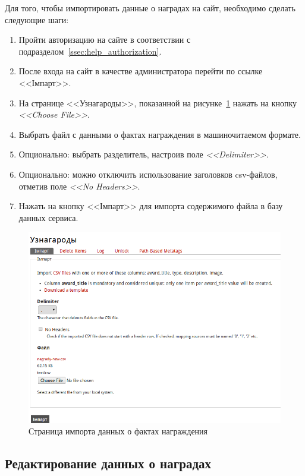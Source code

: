Для того, чтобы импортировать данные о наградах на сайт,
необходимо сделать следующие шаги:

\begin{enumerate}
\item Пройти авторизацию на сайте в соответствии с подразделом~\ref{ssec:help_authorization}.
\item После входа на сайт в качестве администратора перейти по ссылке <<Імпарт>>.
\item На странице <<Узнагароды>>, показанной на рисунке~\ref{fig:import_page}
  нажать на кнопку \textit{<<Choose File>>}.
\item Выбрать файл с данными о фактах награждения в машиночитаемом формате.
\item Опционально: выбрать разделитель, настроив поле \textit{<<Delimiter>>}.
\item Опционально: можно отключить использование заголовков csv-файлов,
   отметив поле \textit{<<No Headers>>}.
\item Нажать на кнопку <<Імпарт>> для импорта содержимого файла в базу данных сервиса.
\end{enumerate}

\begin{figure}[h]
  \centering
  \includegraphics[width=150mm]{pic/import_page.png}
  \caption{Страница импорта данных о фактах награждения}
  \label{fig:import_page}
\end{figure}

\subsection{Редактирование данных о наградах}
\label{ssec:help_edit_awards}

